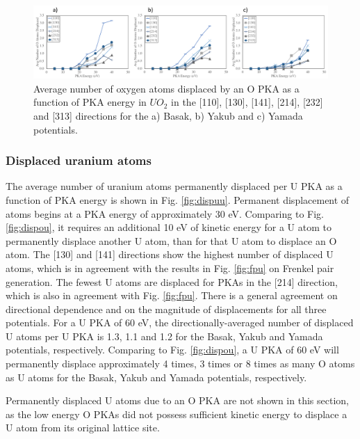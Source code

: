 \documentclass[8pt]{article}   	%
\begin{document}
\begin{figure}[h]
 \centering
 \includegraphics[width=1.0\textwidth]{dispO_O.png}
 \caption{Average number of oxygen atoms displaced by an O PKA as a function of PKA energy in $UO_2$ in the [110], [130], [141], [214], [232] and [313] directions for the a) Basak, b) Yakub and c) Yamada potentials.   }
 \label{fig:dispoo}
\end{figure}

\FloatBarrier

\subsubsection{Displaced uranium atoms}
\hspace{5mm}

The average number of uranium atoms permanently displaced per U PKA as a function of PKA energy is shown in Fig. \ref{fig:dispuu}. Permanent displacement of atoms begins at a PKA energy of approximately 30 eV. Comparing to Fig. \ref{fig:dispou}, it requires an additional 10 eV of kinetic energy for a U atom to permanently displace another U atom, than for that U atom to displace an O atom. The [130] and [141] directions show the highest number of displaced U atoms, which is in agreement with the results in Fig. \ref{fig:fpu} on Frenkel pair generation. The fewest U atoms are displaced for PKAs in the [214] direction, which is also in agreement with Fig. \ref{fig:fpu}. There is a general agreement on directional dependence and on the magnitude of displacements for all three potentials. For a U PKA of 60 eV, the directionally-averaged number of displaced U atoms per U PKA is 1.3, 1.1 and 1.2 for the Basak, Yakub and Yamada potentials, respectively. Comparing to Fig. \ref{fig:dispou}, a U PKA of 60 eV will permanently displace approximately 4 times, 3 times or 8 times as many O atoms as U atoms for the Basak, Yakub and Yamada potentials, respectively.

Permanently displaced U atoms due to an O PKA are not shown in this section, as the low energy O PKAs did not possess sufficient kinetic energy to displace a U atom from its original lattice site.
\end{document}
